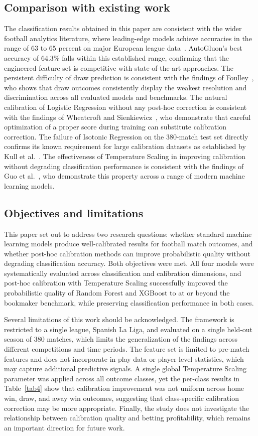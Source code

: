 \documentclass[conference]{IEEEtran}
\begin{document}
\subsection{Comparison with existing work}
The classification results obtained in this paper are
consistent with the wider football analytics literature,
where leading-edge models achieve accuracies in the range
of 63 to 65 percent on major European league data~\cite{b1}\cite{b2}\cite{b3}.
AutoGluon's best accuracy of 64.3\% falls within this
established range, confirming that the engineered feature
set is competitive with state-of-the-art approaches.
The persistent difficulty of draw prediction is consistent
with the findings of Foulley~\cite{b11}, who shows that
draw outcomes consistently display the weakest resolution
and discrimination across all evaluated models and
benchmarks. The natural calibration of Logistic Regression
without any post-hoc correction is consistent with the
findings of Wheatcroft and Sienkiewicz~\cite{b6}, who
demonstrate that careful optimization of a proper score
during training can substitute calibration correction.
The failure of Isotonic Regression on the 380-match test
set directly confirms its known requirement for large
calibration datasets as established by Kull et al.~\cite{b12}.
The effectiveness of Temperature Scaling in improving
calibration without degrading classification performance
is consistent with the findings of Guo et al.~\cite{b9},
who demonstrate this property across a range of modern
machine learning models.

\subsection{Objectives and limitations}
This paper set out to address two research questions:
whether standard machine learning models produce
well-calibrated results for football match outcomes, and
whether post-hoc calibration methods can improve
probabilistic quality without degrading classification
accuracy. Both objectives were met. All four models were
systematically evaluated across classification and
calibration dimensions, and post-hoc calibration with
Temperature Scaling successfully improved the probabilistic
quality of Random Forest and XGBoost to at or beyond the
bookmaker benchmark, while preserving classification
performance in both cases.

Several limitations of this work should be acknowledged.
The framework is restricted to a single league, Spanish
La Liga, and evaluated on a single held-out season of
380 matches, which limits the generalization of the
findings across different competitions and time periods.
The feature set is limited to pre-match features and does
not incorporate in-play data or player-level statistics,
which may capture additional predictive signals. A single
global Temperature Scaling parameter was applied across
all outcome classes, yet the per-class results in
Table~\ref{tab4} show that calibration improvement was
not uniform across home win, draw, and away win outcomes,
suggesting that class-specific calibration correction
may be more appropriate. Finally, the study does not
investigate the relationship between calibration quality
and betting profitability, which remains an important
direction for future work.
\end{document}
